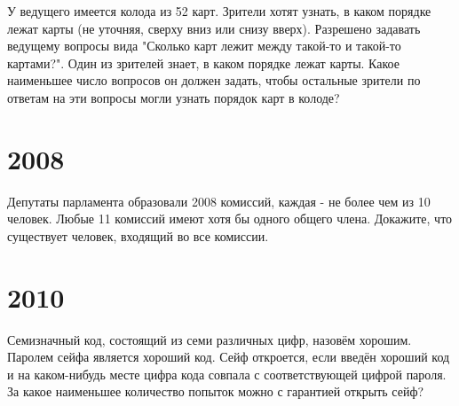 \documentclass[11pt, a4paper]{template}
\begin{document}
\begin{exercise}[M2033]
У ведущего имеется колода из 52 карт. Зрители хотят узнать, в каком порядке лежат карты (не уточняя, сверху вниз или снизу вверх). Разрешено задавать ведущему вопросы вида "Сколько карт лежит между такой-то и такой-то картами?". Один из зрителей знает, в каком порядке лежат карты. Какое наименьшее число вопросов он должен задать, чтобы остальные зрители по ответам на эти вопросы могли узнать порядок карт в колоде?
\end{exercise}

\chapter{2008}

\begin{exercise}[M2096]
Депутаты парламента образовали 2008 комиссий, каждая - не более чем из 10 человек. Любые 11 комиссий имеют хотя бы одного общего члена. Докажите, что существует человек, входящий во все комиссии.
\end{exercise}



\chapter{2010}

\begin{exercise}[M2162]
Семизначный код, состоящий из семи различных цифр, назовём хорошим. Паролем сейфа является хороший код. Сейф откроется, если введён хороший код и на каком-нибудь месте цифра кода совпала с соответствующей цифрой пароля. За какое наименьшее количество попыток можно с гарантией открыть сейф?
\end{exercise}
\end{document}
